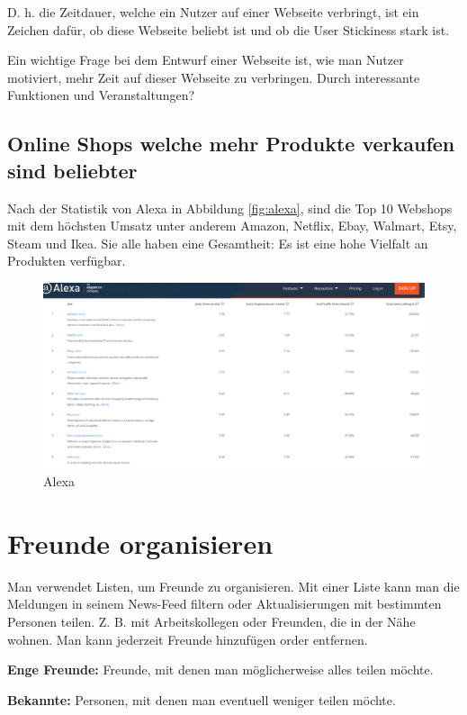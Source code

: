 D. h. die Zeitdauer, welche ein Nutzer auf einer Webseite verbringt, ist ein Zeichen dafür, ob diese Webseite beliebt ist und ob die User Stickiness stark ist.

Ein wichtige Frage bei dem Entwurf einer Webseite ist, wie man Nutzer motiviert, mehr Zeit auf dieser Webseite zu verbringen. Durch interessante Funktionen und Veranstaltungen?


\subsection{Online Shops welche mehr Produkte verkaufen sind beliebter}

Nach der Statistik von Alexa in Abbildung \vref{fig:alexa}, sind die Top 10 Webshops mit dem höchsten Umsatz unter anderem Amazon, Netflix, Ebay, Walmart, Etsy, Steam und Ikea. Sie alle haben eine Gesamtheit: Es ist eine hohe Vielfalt an Produkten verfügbar.

\begin{figure}
	\centering
	\includegraphics[width=1\textwidth]{bilder/alexa.png}
	\caption{Alexa}
	\label{fig:alexa}
\end{figure}


\section{Freunde organisieren}

Man verwendet Listen, um  Freunde zu organisieren. Mit einer Liste kann man die Meldungen in seinem News-Feed filtern oder Aktualisierungen mit bestimmten Personen teilen. Z. B. mit Arbeitskollegen oder Freunden, die in der Nähe wohnen. Man kann jederzeit Freunde hinzufügen order entfernen. \parencite{facebook:help}

\textbf{Enge Freunde:} Freunde, mit denen man möglicherweise alles teilen möchte.

\textbf{Bekannte:} Personen, mit denen man eventuell weniger teilen möchte.


